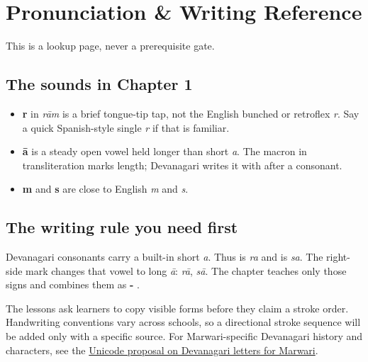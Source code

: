 
\chapter*{Pronunciation \& Writing Reference}

This is a lookup page, never a prerequisite gate.

\section*{The sounds in Chapter 1}

\begin{itemize}
\raggedright
\setlength{\itemsep}{0.35em}
  \item \textbf{r} in \emph{rām} is a brief tongue-tip tap, not the English bunched or retroflex \emph{r}. Say a quick Spanish-style single \emph{r} if that is familiar.
  \item \textbf{ā} is a steady open vowel held longer than short \emph{a}. The macron in transliteration marks length; Devanagari writes it with \textbf{} after a consonant.
  \item \textbf{m} and \textbf{s} are close to English \emph{m} and \emph{s}.
\end{itemize}

\section*{The writing rule you need first}

Devanagari consonants carry a built-in short \emph{a}. Thus \textbf{} is \emph{ra} and \textbf{} is \emph{sa}. The right-side mark \textbf{} changes that vowel to long \emph{ā}: \textbf{} \emph{rā}, \textbf{} \emph{sā}. The chapter teaches only those signs and combines them as \textbf{- }.

The lessons ask learners to copy visible forms before they claim a stroke order. Handwriting conventions vary across schools, so a directional stroke sequence will be added only with a specific source. For Marwari-specific Devanagari history and characters, see the \href{https://www.unicode.org/L2/L2010/10475-devanagari-marwari-dda.pdf}{Unicode proposal on Devanagari letters for Marwari}.

